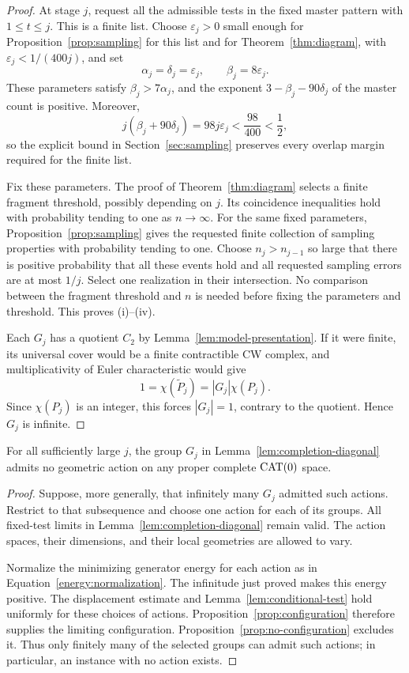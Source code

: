 \begin{proof}
At stage $j$, request all the admissible tests in the fixed master pattern with $1\le t\le j$. This is a finite list. Choose $\varepsilon_j>0$ small enough for Proposition~\ref{prop:sampling} for this list and for Theorem~\ref{thm:diagram}, with $\varepsilon_j<1/(400j)$, and set
\[
 \alpha_j=\delta_j=\varepsilon_j,
 \qquad \beta_j=8\varepsilon_j.
\]
These parameters satisfy $\beta_j>7\alpha_j$, and the exponent $3-\beta_j-90\delta_j$ of the master count is positive. Moreover,
\[
 j(\beta_j+90\delta_j)=98j\varepsilon_j<\frac{98}{400}<\frac12,
\]
so the explicit bound in Section~\ref{sec:sampling} preserves every overlap margin required for the finite list.

Fix these parameters. The proof of Theorem~\ref{thm:diagram} selects a finite fragment threshold, possibly depending on $j$. Its coincidence inequalities hold with probability tending to one as $n\to\infty$. For the same fixed parameters, Proposition~\ref{prop:sampling} gives the requested finite collection of sampling properties with probability tending to one. Choose $n_j>n_{j-1}$ so large that there is positive probability that all these events hold and all requested sampling errors are at most $1/j$. Select one realization in their intersection. No comparison between the fragment threshold and $n$ is needed before fixing the parameters and threshold. This proves \textup{(i)}--\textup{(iv)}.

Each $G_j$ has a quotient $C_2$ by Lemma~\ref{lem:model-presentation}. If it were finite, its universal cover would be a finite contractible CW complex, and multiplicativity of Euler characteristic would give
\[
 1=\chi(\widetilde P_j)=|G_j|\chi(P_j).
\]
Since $\chi(P_j)$ is an integer, this forces $|G_j|=1$, contrary to the quotient. Hence $G_j$ is infinite.
\end{proof}

\begin{proposition}\label{prop:completion-no-action}
For all sufficiently large $j$, the group $G_j$ in Lemma~\ref{lem:completion-diagonal} admits no geometric action on any proper complete $\operatorname{CAT}(0)$ space.
\end{proposition}
\begin{proof}
Suppose, more generally, that infinitely many $G_j$ admitted such actions. Restrict to that subsequence and choose one action for each of its groups. All fixed-test limits in Lemma~\ref{lem:completion-diagonal} remain valid. The action spaces, their dimensions, and their local geometries are allowed to vary.

Normalize the minimizing generator energy for each action as in Equation~\eqref{energy:normalization}. The infinitude just proved makes this energy positive. The displacement estimate and Lemma~\ref{lem:conditional-test} hold uniformly for these choices of actions. Proposition~\ref{prop:configuration} therefore supplies the limiting configuration. Proposition~\ref{prop:no-configuration} excludes it. Thus only finitely many of the selected groups can admit such actions; in particular, an instance with no action exists.
\end{proof}

